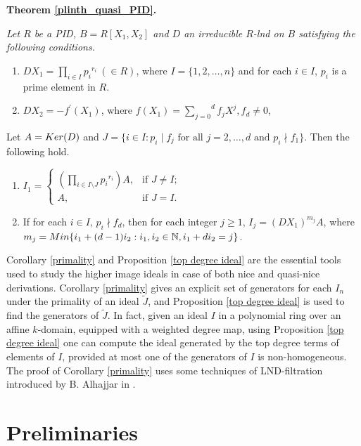 \documentclass[a4paper,12pt]{article}
\newcommand{\bN}{\mathbb N}
\begin{document}
{\medskip\noindent
{\bf Theorem \ref{plinth_quasi_PID}.} {\it Let $R$ be a {\rm PID}, $B=R[X_1,X_2]$ and $D$ an irreducible $R$-lnd on $B$ satisfying the following conditions.

\begin{enumerate}
\item [\rm(i)] $DX_1=\underset{i\in I}\prod{p_i}^{r_i}~(\in R)$, where $I=\{1,2,\dots,n\}$ and for each $i\in I$, $p_i$ is a prime element in $R$.
\item[\rm(ii)] $DX_2=-f^{\prime}(X_1)$, where $f(X_1)=\overset{d}{\underset{j=0}{\sum}} f_jX^j, f_d\neq 0$,
\end{enumerate}
Let $A={\rm Ker}(D)$ and  $J=\{i\in I:p_i\mid f_j \text{ for all }j=2,\dots,d \text{ and }p_i\nmid f_1\}$. Then the following hold.

\begin{enumerate}
\item[\rm(I)] $I_1=
\begin{cases}
	({\underset{i\in I\setminus J}\prod}{p_i}^{r_i})A, & \text{if } J\neq I;\\
	A, & \text{if } J=I.
\end{cases}
$
\item[\rm(II)]  If for each $i\in I$, $p_i\nmid f_d$, then for each integer $j\geqslant 1$, $I_j=(DX_1)^{m_j}A$, where $m_j={\rm Min}\{i_1+(d-1)i_2:i_1,i_2\in\bN,i_1+di_2=j\}$. 

\end{enumerate}}

\medskip\indent
Corollary \ref{primality} and Proposition \ref{top degree ideal} are the essential tools used to study the higher image ideals in case of both nice and quasi-nice derivations. Corollary \ref{primality} gives an explicit set of generators for each $I_n$ under the primality of an ideal $\widetilde{J}$, and Proposition \ref{top degree ideal} is used to find the generators of $\widetilde{J}$. In fact, given an ideal $I$ in a polynomial ring over an affine $k$-domain, equipped with a weighted degree map, using Proposition \ref{top degree ideal} one can compute the ideal generated by the top degree terms of elements of $I$, provided at most one of the generators of $I$ is non-homogeneous. The proof of Corollary \ref{primality} uses some techniques of LND-filtration introduced by B. Alhajjar in \cite{A}.


\section{Preliminaries}

}
\end{document}
